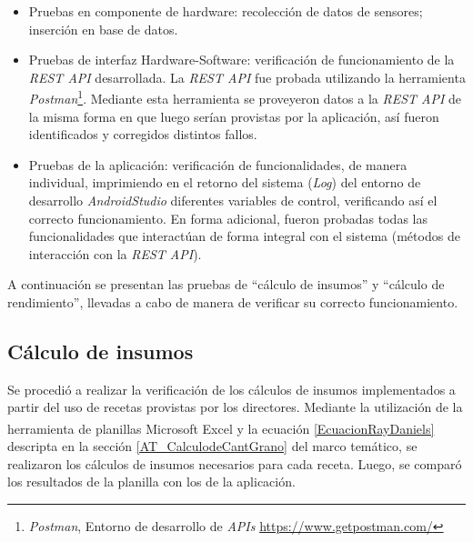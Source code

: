 \begin{itemize}
    \item Pruebas en componente de hardware: recolección de datos de sensores; inserción en base de datos.
    \item Pruebas de interfaz Hardware-Software: verificación de funcionamiento de la \textit{REST API} desarrollada. La \textit{REST API} fue probada utilizando la herramienta \textit{Postman}\footnote{\textit{Postman}, Entorno de desarrollo de \textit{APIs} \url{https://www.getpostman.com/}}. Mediante esta herramienta se proveyeron datos a la \textit{REST API} de la misma forma en que luego serían provistas por la aplicación, así fueron identificados y corregidos distintos fallos.
    \item Pruebas de la aplicación: verificación de funcionalidades, de manera individual, imprimiendo en el retorno del sistema (\textit{Log}) del entorno de desarrollo \textit{AndroidStudio} diferentes variables de control, verificando así el correcto funcionamiento. En forma adicional, fueron probadas todas las funcionalidades que interactúan de forma integral con el sistema (métodos de interacción con la \textit{REST API}).
\end{itemize}

\par A continuación se presentan las pruebas de ``cálculo de insumos'' y ``cálculo de rendimiento'', llevadas a cabo de manera de verificar su correcto funcionamiento.

\subsection{Cálculo de insumos}


\par Se procedió a realizar la verificación de los cálculos de insumos implementados a partir del uso de recetas provistas por los directores. Mediante la utilización de la herramienta de planillas Microsoft \textsuperscript{\textregistered} Excel y la ecuación \ref{EcuacionRayDaniels} descripta en la sección \ref{AT_CalculodeCantGrano} del marco temático, se realizaron los cálculos de insumos necesarios para cada receta. Luego, se comparó los resultados de la planilla con los de la aplicación.

